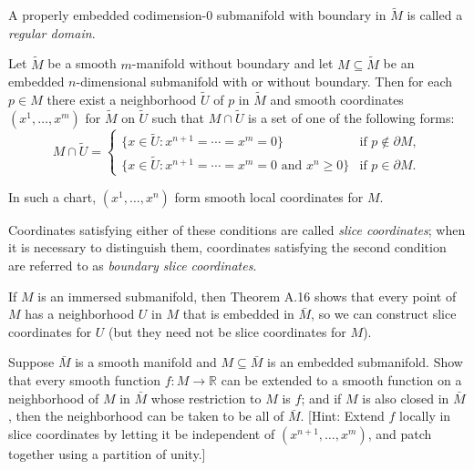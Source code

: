 A properly embedded codimension-$0$ submanifold with boundary in $\tilde{M}$ is called a \emph{regular domain}.

\begin{proposition}
\label{prop:slice-coordinates}
Let $\tilde{M}$ be a smooth $m$-manifold without boundary and let $M \subseteq \tilde{M}$ be an embedded $n$-dimensional submanifold with or without boundary. Then for each $p \in M$ there exist a neighborhood $\tilde{U}$ of $p$ in $\tilde{M}$ and smooth coordinates $(x^1, \ldots, x^m)$ for $\tilde{M}$ on $\tilde{U}$ such that $M \cap \tilde{U}$ is a set of one of the following forms:
\[
M \cap \tilde{U} = \begin{cases}
\{x \in \tilde{U} : x^{n+1} = \cdots = x^m = 0\} & \text{if } p \notin \partial M, \\
\{x \in \tilde{U} : x^{n+1} = \cdots = x^m = 0 \text{ and } x^n \geq 0\} & \text{if } p \in \partial M.
\end{cases}
\]

In such a chart, $(x^1, \ldots, x^n)$ form smooth local coordinates for $M$.
\end{proposition}

Coordinates satisfying either of these conditions are called \emph{slice coordinates}; when it is necessary to distinguish them, coordinates satisfying the second condition are referred to as \emph{boundary slice coordinates}.

If $M$ is an immersed submanifold, then Theorem A.16 shows that every point of $M$ has a neighborhood $U$ in $M$ that is embedded in $\bar{M}$, so we can construct slice coordinates for $U$ (but they need not be slice coordinates for $M$).

\begin{exercise}
\label{exer:extension-smooth-function}
Suppose $\bar{M}$ is a smooth manifold and $M \subseteq \bar{M}$ is an embedded submanifold. Show that every smooth function $f : M \to \mathbb{R}$ can be extended to a smooth function on a neighborhood of $M$ in $\bar{M}$ whose restriction to $M$ is $f$; and if $M$ is also closed in $\bar{M}$, then the neighborhood can be taken to be all of $\bar{M}$. [Hint: Extend $f$ locally in slice coordinates by letting it be independent of $(x^{n+1},\ldots,x^m)$, and patch together using a partition of unity.]
\end{exercise}

